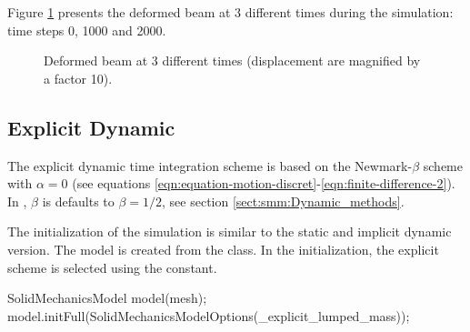 Figure \ref{fig:smm:implicit:dynamic_solution} presents the deformed
beam at 3 different times during the simulation: time steps 0, 1000 and
2000.

\begin{figure}[!htb]
  \centering
  \setlength{\unitlength}{0.1\textwidth}

  \caption{Deformed beam at 3 different times (displacement are
    magnified by a factor 10).}
  \label{fig:smm:implicit:dynamic_solution}
\end{figure}

\subsection{Explicit Dynamic}

The explicit dynamic time integration scheme is based on the
Newmark-$\beta$ scheme with $\alpha=0$ (see equations
\ref{eqn:equation-motion-discret}-\ref{eqn:finite-difference-2}).  In
\akantu, $\beta$ is defaults to $\beta=1/2$, see section
\ref{sect:smm:Dynamic_methods}.

The initialization of the simulation is similar to the static and
implicit dynamic version.  The model is created from the
 class.  In the initialization, the explicit
scheme is selected using the  constant.

\begin{cpp}
SolidMechanicsModel model(mesh);
model.initFull(SolidMechanicsModelOptions(_explicit_lumped_mass));
\end{cpp}

